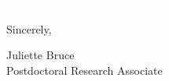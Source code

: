\documentclass[11pt]{article}
\begin{document}
\vspace{24pt}
\noindent
\begin{minipage}{0.99\textwidth}
\begin{minipage}{0.69\textwidth}
\textcolor{white}{.}
\end{minipage}
\begin{minipage}{0.29\textwidth}
Sincerely, 

\vspace{36pt}
Juliette Bruce\\
Postdoctoral Research Associate\end{minipage}
\end{minipage}

\end{document}
